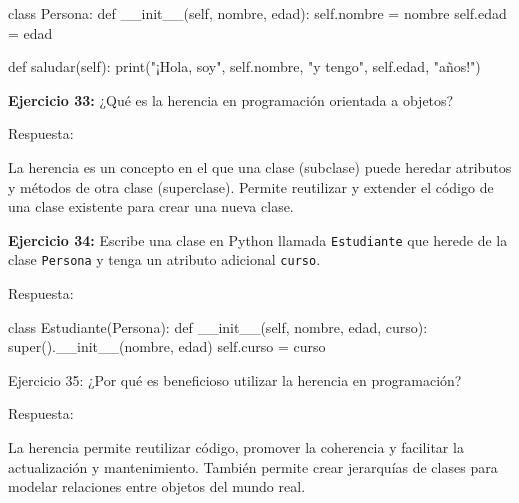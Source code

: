\documentclass[
  a4paper,
  DIV=11,
  numbers=noendperiod,
  onepage,
  openany]{scrreprt}
\newenvironment{Shaded}{\begin{snugshade}}{\end{snugshade}}
\newcommand{\BuiltInTok}[1]{\textcolor[rgb]{0.00,0.23,0.31}{#1}}
\newcommand{\FunctionTok}[1]{\textcolor[rgb]{0.28,0.35,0.67}{#1}}
\newcommand{\KeywordTok}[1]{\textcolor[rgb]{0.00,0.23,0.31}{#1}}
\newcommand{\NormalTok}[1]{\textcolor[rgb]{0.00,0.23,0.31}{#1}}
\newcommand{\OperatorTok}[1]{\textcolor[rgb]{0.37,0.37,0.37}{#1}}
\newcommand{\StringTok}[1]{\textcolor[rgb]{0.13,0.47,0.30}{#1}}
\newcommand{\VariableTok}[1]{\textcolor[rgb]{0.07,0.07,0.07}{#1}}
\begin{document}
\begin{Shaded}
\begin{Highlighting}[]
\KeywordTok{class}\NormalTok{ Persona:}
    \KeywordTok{def} \FunctionTok{\_\_init\_\_}\NormalTok{(}\VariableTok{self}\NormalTok{, nombre, edad):}
        \VariableTok{self}\NormalTok{.nombre }\OperatorTok{=}\NormalTok{ nombre}
        \VariableTok{self}\NormalTok{.edad }\OperatorTok{=}\NormalTok{ edad}
\end{Highlighting}
\end{Shaded}

\begin{Shaded}
\begin{Highlighting}[]
\KeywordTok{def}\NormalTok{ saludar(}\VariableTok{self}\NormalTok{):}
    \BuiltInTok{print}\NormalTok{(}\StringTok{"¡Hola, soy"}\NormalTok{, }\VariableTok{self}\NormalTok{.nombre, }\StringTok{"y tengo"}\NormalTok{, }\VariableTok{self}\NormalTok{.edad, }\StringTok{"años!"}\NormalTok{)}
\end{Highlighting}
\end{Shaded}

\textbf{Ejercicio 33:} ¿Qué es la herencia en programación orientada a
objetos?

Respuesta:

La herencia es un concepto en el que una clase (subclase) puede heredar
atributos y métodos de otra clase (superclase). Permite reutilizar y
extender el código de una clase existente para crear una nueva clase.

\textbf{Ejercicio 34:} Escribe una clase en Python llamada
\texttt{Estudiante} que herede de la clase \texttt{Persona} y tenga un
atributo adicional \texttt{curso}.

Respuesta:

\begin{Shaded}
\begin{Highlighting}[]
\KeywordTok{class}\NormalTok{ Estudiante(Persona):}
    \KeywordTok{def} \FunctionTok{\_\_init\_\_}\NormalTok{(}\VariableTok{self}\NormalTok{, nombre, edad, curso):}
        \BuiltInTok{super}\NormalTok{().}\FunctionTok{\_\_init\_\_}\NormalTok{(nombre, edad)}
        \VariableTok{self}\NormalTok{.curso }\OperatorTok{=}\NormalTok{ curso}
\end{Highlighting}
\end{Shaded}

Ejercicio 35: ¿Por qué es beneficioso utilizar la herencia en
programación?

Respuesta:

La herencia permite reutilizar código, promover la coherencia y
facilitar la actualización y mantenimiento. También permite crear
jerarquías de clases para modelar relaciones entre objetos del mundo
real.
\end{document}
